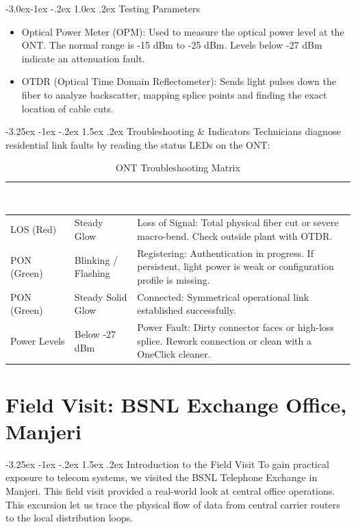 \documentclass[11pt,a4paper]{report}
\makeatletter
\renewcommand{\section}{\@startsection{section}{1}{\z@}%
  {-3.25ex \@plus -1ex \@minus -.2ex}%
  {1.5ex \@plus.2ex}%
  {\normalfont\Large\bfseries\color{primaryColor}}}
\renewcommand{\subsection}{\@startsection{subsection}{2}{\z@}%
  {-3.0ex\@plus -1ex \@minus -.2ex}%
  {1.0ex \@plus .2ex}%
  {\normalfont\large\bfseries\color{secondaryColor}}}
\makeatother
\begin{document}
\subsection{Testing Parameters}
\begin{itemize}
  \item Optical Power Meter (OPM): Used to measure the optical power level at the ONT. The normal range is -15 dBm to -25 dBm. Levels below -27 dBm indicate an attenuation fault.
  \item OTDR (Optical Time Domain Reflectometer): Sends light pulses down the fiber to analyze backscatter, mapping splice points and finding the exact location of cable cuts.
\end{itemize}
\section{Troubleshooting \& Indicators}
Technicians diagnose residential link faults by reading the status LEDs on the ONT:
\begin{table}[H]
\centering
\begin{tabularx}{\textwidth}{l l X}
\rowcolor{primaryColor}
\textcolor{white}{\textbf{ONT Indicator}} & \textcolor{white}{\textbf{Status State}} & \textcolor{white}{\textbf{Meaning / Corrective Action}} \\
\midrule
LOS (Red) & Steady Glow & Loss of Signal: Total physical fiber cut or severe macro-bend. Check outside plant with OTDR. \\
PON (Green) & Blinking / Flashing & Registering: Authentication in progress. If persistent, light power is weak or configuration profile is missing. \\
PON (Green) & Steady Solid Glow & Connected: Symmetrical operational link established successfully. \\
Power Levels & Below -27 dBm & Power Fault: Dirty connector faces or high-loss splice. Rework connection or clean with a OneClick cleaner. \\
\bottomrule
\end{tabularx}
\caption{ONT Troubleshooting Matrix}
\end{table}
\chapter{Field Visit: BSNL Exchange Office, Manjeri}
\section{Introduction to the Field Visit}
To gain practical exposure to telecom systems, we visited the BSNL Telephone Exchange in Manjeri. This field visit provided a real-world look at central office operations. This excursion let us trace the physical flow of data from central carrier routers to the local distribution loops.
\end{document}
